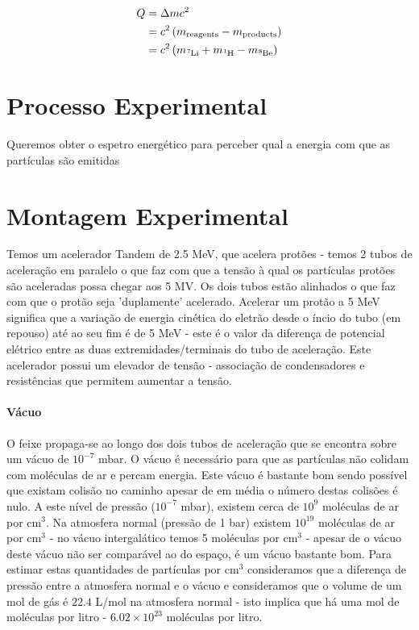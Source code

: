 \documentclass{article}
\begin{document}
\begin{multicols}{2}
\begin{equation}
  \begin{split}
      Q &= \Delta m c^2 \\
      &= c^2 \left( m_{\text{reagents}} - m_{\text{products}} \right) \\
      &= c^2 \left( m_{\ce{^7Li}} + m_{\ce{^1H}} - m_{\ce{^8Be}} \right)
  \end{split}
\end{equation}
    

\section{Processo Experimental}

Queremos obter o espetro energético para perceber qual a energia com que as partículas são emitidas

\section{Montagem Experimental}

Temos um acelerador Tandem de 2.5 MeV, que acelera protões - temos 2 tubos de aceleração em paralelo o que faz com que a tensão à qual os partículas protões são aceleradas possa chegar aos 5 MV. Os dois tubos estão alinhados o que faz com que o protão seja 'duplamente' acelerado.
Acelerar um protão a 5 MeV significa que a variação de energia cinética do eletrão desde o íncio do tubo (em repouso) até ao seu fim é de 5 MeV - este é o valor da diferença de potencial elétrico entre as duas extremidades/terminais do tubo de aceleração. 
Este acelerador possui um elevador de tensão - associação de condensadores e resistências que permitem aumentar a tensão.

\paragraph*{Vácuo} O feixe propaga-se ao longo dos dois tubos de aceleração que se encontra sobre um vácuo de $10^{-7}$ mbar. O vácuo é necessário para que as partículas não colidam com moléculas de ar e percam energia.
Este vácuo é bastante bom sendo possível que existam colisão no caminho apesar de em média o número destas colisões é nulo.
A este nível de pressão ($10^{-7}$ mbar), existem cerca de $10^9$ moléculas de ar por cm$^3$. Na atmosfera normal (pressão de 1 bar) existem $10^{19}$ moléculas de ar por cm$^3$ - no vácuo intergalático temos 5 moléculas por cm$^3$ - apesar de o vácuo deste vácuo não ser comparável ao do espaço, é um vácuo bastante bom. 
Para estimar estas quantidades de partículas por cm$^3$ consideramos que a diferença de pressão entre a atmosfera normal e o vácuo e consideramos que o volume de um mol de gás é $22.4$ L/mol na atmosfera normal - isto implica que há uma mol de moléculas por litro - $6.02 \times 10^{23}$ moléculas por litro.


\end{multicols}
\end{document}
